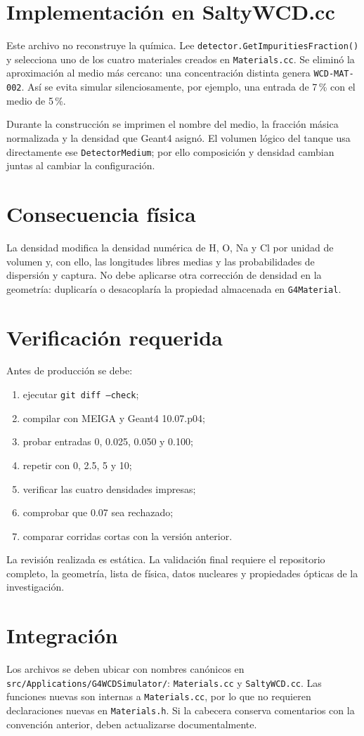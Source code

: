 \documentclass[11pt,a4paper]{article}
\newcommand{\codigo}[1]{\texttt{#1}}
\begin{document}
\section{Implementación en SaltyWCD.cc}
Este archivo no reconstruye la química. Lee
\codigo{detector.GetImpuritiesFraction()} y selecciona uno de los cuatro
materiales creados en \codigo{Materials.cc}. Se eliminó la aproximación al
medio más cercano: una concentración distinta genera
\codigo{WCD-MAT-002}. Así se evita simular silenciosamente, por ejemplo, una
entrada de 7\,\% con el medio de 5\,\%.

Durante la construcción se imprimen el nombre del medio, la fracción másica
normalizada y la densidad que Geant4 asignó. El volumen lógico del tanque usa
directamente ese \codigo{DetectorMedium}; por ello composición y densidad
cambian juntas al cambiar la configuración.

\section{Consecuencia física}
La densidad modifica la densidad numérica de H, O, Na y Cl por unidad de
volumen y, con ello, las longitudes libres medias y las probabilidades de
dispersión y captura. No debe aplicarse otra corrección de densidad en la
geometría: duplicaría o desacoplaría la propiedad almacenada en
\codigo{G4Material}.

\section{Verificación requerida}
Antes de producción se debe:
\begin{enumerate}
\item ejecutar \codigo{git diff --check};
\item compilar con MEIGA y Geant4 10.07.p04;
\item probar entradas 0, 0.025, 0.050 y 0.100;
\item repetir con 0, 2.5, 5 y 10;
\item verificar las cuatro densidades impresas;
\item comprobar que 0.07 sea rechazado;
\item comparar corridas cortas con la versión anterior.
\end{enumerate}
La revisión realizada es estática. La validación final requiere el repositorio
completo, la geometría, lista de física, datos nucleares y propiedades ópticas
de la investigación.

\section{Integración}
Los archivos se deben ubicar con nombres canónicos en
\codigo{src/Applications/G4WCDSimulator/}: \codigo{Materials.cc} y
\codigo{SaltyWCD.cc}. Las funciones nuevas son internas a
\codigo{Materials.cc}, por lo que no requieren declaraciones nuevas en
\codigo{Materials.h}. Si la cabecera conserva comentarios con la convención
anterior, deben actualizarse documentalmente.
\end{document}
